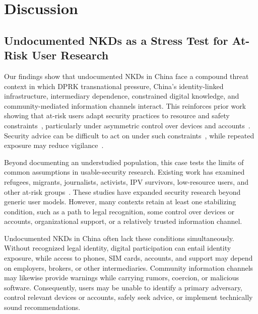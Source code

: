 \documentclass[conference,compsoc]{IEEEtran}
\begin{document}
\section{Discussion}
\subsection{Undocumented NKDs as a Stress Test for At-Risk User Research}

Our findings show that undocumented NKDs in China face a compound threat context in which DPRK transnational pressure, China's identity-linked infrastructure, intermediary dependence, constrained digital knowledge, and community-mediated information channels interact. This reinforces prior work showing that at-risk users adapt security practices to resource and safety constraints~\cite{simko2018computer,mcgregor2017weakest,sambasivan2018privacy,tran2024security}, particularly under asymmetric control over devices and accounts~\cite{freed2017digital,matthews2017stories,tseng2022care,leitao2019anticipating}. Security advice can be difficult to act on under such constraints~\cite{herley2009so,ion2015no,redmiles2020comprehensive,hielscher2023employees}, while repeated exposure may reduce vigilance~\cite{vance2018tuning,anderson2015polymorphic,felt2012android}.

Beyond documenting an understudied population, this case tests the limits of common assumptions in usable-security research. Existing work has examined refugees, migrants, journalists, activists, IPV survivors, low-resource users, and other at-risk groups~\cite{warford2022sok,simko2018computer,mcgregor2017weakest,freed2017digital,tran2024security}. These studies have expanded security research beyond generic user models. However, many contexts retain at least one stabilizing condition, such as a path to legal recognition, some control over devices or accounts, organizational support, or a relatively trusted information channel.

Undocumented NKDs in China often lack these conditions simultaneously. Without recognized legal identity, digital participation can entail identity exposure, while access to phones, SIM cards, accounts, and support may depend on employers, brokers, or other intermediaries. Community information channels may likewise provide warnings while carrying rumors, coercion, or malicious software. Consequently, users may be unable to identify a primary adversary, control relevant devices or accounts, safely seek advice, or implement technically sound recommendations.
\end{document}
